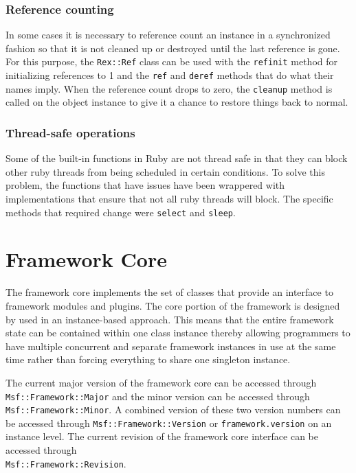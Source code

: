 \documentclass{report}
\begin{document}
        \subsection{Reference counting}

\par
In some cases it is necessary to reference count an instance in a
synchronized fashion so that it is not cleaned up or destroyed until
the last reference is gone.  For this purpose, the \texttt{Rex::Ref}
class can be used with the \texttt{refinit} method for initializing
references to 1 and the \texttt{ref} and \texttt{deref} methods that
do what their names imply.  When the reference count drops to zero,
the \texttt{cleanup} method is called on the object instance to give
it a chance to restore things back to normal.

        \subsection{Thread-safe operations}

\par
Some of the built-in functions in Ruby are not thread safe in that
they can block other ruby threads from being scheduled in certain
conditions.  To solve this problem, the functions that have issues
have been wrappered with implementations that ensure that not all
ruby threads will block.  The specific methods that required change
were \texttt{select} and \texttt{sleep}.

\chapter{Framework Core}

\par
The framework core implements the set of classes that provide an
interface to framework modules and plugins.  The core portion of the
framework is designed by used in an instance-based approach.  This
means that the entire framework state can be contained within one
class instance thereby allowing programmers to have multiple
concurrent and separate framework instances in use at the same time
rather than forcing everything to share one singleton instance.

\par
The current major version of the framework core can be accessed
through \texttt{Msf::Framework::Major} and the minor version can be
accessed through \texttt{Msf::Framework::Minor}.  A combined version
of these two version numbers can be accessed through
\texttt{Msf::Framework::Version} or \texttt{framework.version} on an
instance level.  The current revision of the framework core
interface can be accessed through
\\\texttt{Msf::Framework::Revision}.
\end{document}
